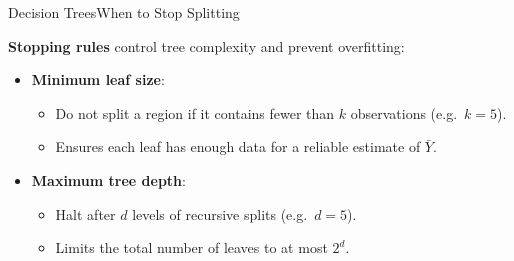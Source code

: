 \documentclass[hyperref={pdfpagelabels=false}]{beamer}
\begin{document}
\begin{frame}{Decision Trees}{When to Stop Splitting}

\textbf{Stopping rules} control tree complexity and prevent overfitting:
\vspace{0.3cm}
\begin{itemize}
  \item \textbf{Minimum leaf size}: 
  \begin{itemize}
    \vspace{0.2cm}
\item  Do not split a region if it contains fewer than $k$ observations (e.g.\ $k = 5$). 
     \vspace{0.05cm}
    \item  Ensures each leaf has enough data for a reliable estimate of $\bar{Y}$.
  \end{itemize}
  \vspace{0.2cm}
  \item \textbf{Maximum tree depth}:
  \begin{itemize}
    \vspace{0.2cm}

    \item Halt after $d$ levels of recursive splits (e.g.\ $d = 5$). 
      \vspace{0.2cm}

    \item Limits the total number of leaves to at most $2^d$.
  \end{itemize}
\end{itemize}

\end{frame}
\end{document}

